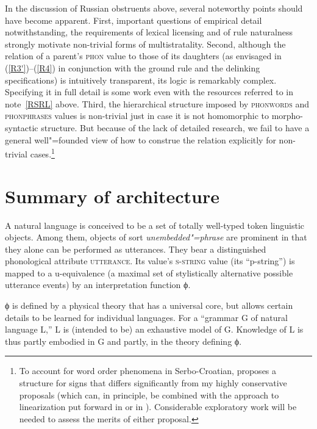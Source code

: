 \documentclass[output=paper]{langsci/langscibook}
\begin{document}
\begin{sloppypar}
In the discussion of Russian obstruents above, several noteworthy points
should have become apparent. First, important questions of empirical detail
notwithstanding, the requirements of lexical licensing and of rule
naturalness strongly motivate non-trivial forms of multistratality. Second,
although the relation of a parent's \textsc{phon} value to those of its
daughters (as envisaged in (\ref{R3'})--(\ref{R4}) in conjunction with the
ground rule and the delinking specifications) is intuitively transparent,
its logic is remarkably complex.  Specifying it in full detail is some work
even with the resources referred to in note~\ref{RSRL} above. Third, the
hierarchical structure imposed by \textsc{phonwords} and \textsc{phonphrases}
values is non-trivial just in case it is not homomorphic to
morpho-syntactic structure. But because of the lack of detailed research, we
fail to have a general well"=founded view of how to construe the relation
explicitly for non-trivial cases.\footnote{%
	To account for word order
  phenomena in Serbo-Croatian, \cite{penn:98} proposes a
  structure for signs that differs significantly from my highly
  conservative proposals (which can, in principle, be combined with the
  approach to linearization put forward in \citealt{rich:97} or in \citealt{sail:97}). Considerable
  exploratory work will be needed to assess the merits of either
  proposal.%
}
\end{sloppypar}




\section{Summary of architecture}
\label{sectSum}
 
A natural language is conceived to be a set of totally well-typed token
linguistic objects.  Among them, objects of sort \textit{unembedded"=phrase}\/
are prominent in that they alone can be performed as utterances. They bear
a distinguished phonological attribute \textsc{utterance}. Its value's \textsc{s-string} 
value (its ``p-string'') is mapped to a u-equivalence (a maximal
set of stylistically alternative possible utterance events) by
an interpretation function ϕ.

ϕ is defined by a physical theory that has a universal core, but
allows certain details to be learned for individual languages.  For a
``grammar G of natural language L,'' L is (intended to be) an exhaustive
model of G\@.  Knowledge of L is thus partly embodied in G and partly, in
the theory defining ϕ.
\end{document}
